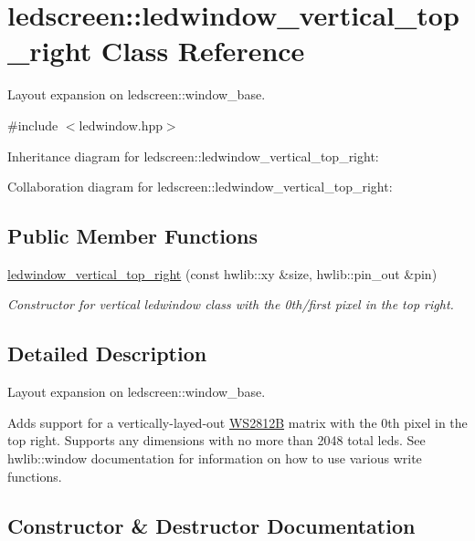\hypertarget{classledscreen_1_1ledwindow__vertical__top__right}{}\section{ledscreen\+:\+:ledwindow\+\_\+vertical\+\_\+top\+\_\+right Class Reference}
\label{classledscreen_1_1ledwindow__vertical__top__right}


Layout expansion on ledscreen\+::window\+\_\+base.  




{\ttfamily \#include $<$ledwindow.\+hpp$>$}



Inheritance diagram for ledscreen\+:\+:ledwindow\+\_\+vertical\+\_\+top\+\_\+right\+:


Collaboration diagram for ledscreen\+:\+:ledwindow\+\_\+vertical\+\_\+top\+\_\+right\+:
\subsection*{Public Member Functions}
\begin{DoxyCompactItemize}
\item 
\hyperlink{classledscreen_1_1ledwindow__vertical__top__right_ad0b57a13a3419f3e7462b3ef0734eca7}{ledwindow\+\_\+vertical\+\_\+top\+\_\+right} (const hwlib\+::xy \&size, hwlib\+::pin\+\_\+out \&pin)
\begin{DoxyCompactList}\small\item\em Constructor for vertical ledwindow class with the 0th/first pixel in the top right. \end{DoxyCompactList}\end{DoxyCompactItemize}


\subsection{Detailed Description}
Layout expansion on ledscreen\+::window\+\_\+base. 

Adds support for a vertically-\/layed-\/out \hyperlink{classledscreen_1_1WS2812B}{W\+S2812B} matrix with the 0th pixel in the top right. Supports any dimensions with no more than 2048 total leds. See hwlib\+::window documentation for information on how to use various write functions. 

\subsection{Constructor \& Destructor Documentation}
\mbox{\label{classledscreen_1_1ledwindow__vertical__top__right_ad0b57a13a3419f3e7462b3ef0734eca7}} 
